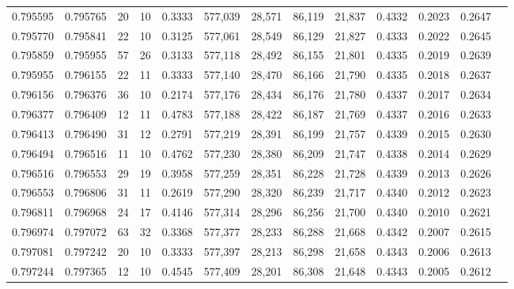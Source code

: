 \begin{tabular}{rrrrrrrrrrrrr}
0.795595 & 0.795765 &    20 &  10 &                                     0.3333 & 577,039 &  28,571 &  86,119 &  21,837 & 0.4332 & 0.2023 & 0.2647 \\
0.795770 & 0.795841 &    22 &  10 &                                     0.3125 & 577,061 &  28,549 &  86,129 &  21,827 & 0.4333 & 0.2022 & 0.2645 \\
0.795859 & 0.795955 &    57 &  26 &                                     0.3133 & 577,118 &  28,492 &  86,155 &  21,801 & 0.4335 & 0.2019 & 0.2639 \\
0.795955 & 0.796155 &    22 &  11 &                                     0.3333 & 577,140 &  28,470 &  86,166 &  21,790 & 0.4335 & 0.2018 & 0.2637 \\
0.796156 & 0.796376 &    36 &  10 &                                     0.2174 & 577,176 &  28,434 &  86,176 &  21,780 & 0.4337 & 0.2017 & 0.2634 \\
0.796377 & 0.796409 &    12 &  11 &                                     0.4783 & 577,188 &  28,422 &  86,187 &  21,769 & 0.4337 & 0.2016 & 0.2633 \\
0.796413 & 0.796490 &    31 &  12 &                                     0.2791 & 577,219 &  28,391 &  86,199 &  21,757 & 0.4339 & 0.2015 & 0.2630 \\
0.796494 & 0.796516 &    11 &  10 &                                     0.4762 & 577,230 &  28,380 &  86,209 &  21,747 & 0.4338 & 0.2014 & 0.2629 \\
0.796516 & 0.796553 &    29 &  19 &                                     0.3958 & 577,259 &  28,351 &  86,228 &  21,728 & 0.4339 & 0.2013 & 0.2626 \\
0.796553 & 0.796806 &    31 &  11 &                                     0.2619 & 577,290 &  28,320 &  86,239 &  21,717 & 0.4340 & 0.2012 & 0.2623 \\
0.796811 & 0.796968 &    24 &  17 &                                     0.4146 & 577,314 &  28,296 &  86,256 &  21,700 & 0.4340 & 0.2010 & 0.2621 \\
0.796974 & 0.797072 &    63 &  32 &                                     0.3368 & 577,377 &  28,233 &  86,288 &  21,668 & 0.4342 & 0.2007 & 0.2615 \\
0.797081 & 0.797242 &    20 &  10 &                                     0.3333 & 577,397 &  28,213 &  86,298 &  21,658 & 0.4343 & 0.2006 & 0.2613 \\
0.797244 & 0.797365 &    12 &  10 &                                     0.4545 & 577,409 &  28,201 &  86,308 &  21,648 & 0.4343 & 0.2005 & 0.2612 \\

\end{tabular}
